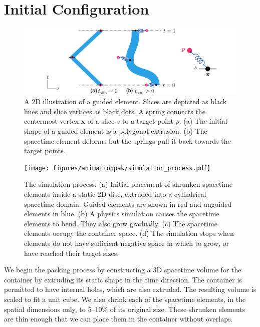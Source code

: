 \section{Initial Configuration}
\label{animationpak_initial_configuration}

\begin{figure}[t]
\centering
\includegraphics[width=1.0\textwidth]{figures/animationpak/guided_element.pdf} 
\caption[A 2D illustration of a guided element]{
\label{fig_animationpak_guided_element} A 2D illustration of a guided element.
Slices are depicted as black lines and slice vertices as black dots.
A spring connects the centermost vertex $\bm{x}$ of a slice $s$ to a target
point $p$.
(a) The initial shape of a guided element is a polygonal extrusion.
(b) The spacetime element deforms but the springs pull it back towards
the target points.}
\end{figure}

\begin{figure}[t]
\centering
\texttt{[image: figures/animationpak/simulation\_process.pdf]} 
\caption[AnimationPak simulation process]{
\label{fig_animationpak_simulation_process} The simulation process. 
(a) Initial placement of 
shrunken spacetime elements inside a static 2D disc, extruded into a 
cylindrical spacetime domain.
Guided elements are shown in red and unguided elements in blue.
(b) A physics simulation causes the spacetime elements to bend. They
also grow gradually.
(c) The spacetime elements occupy the container space.
(d) The simulation stops when elements do not have sufficient negative
space in which to grow, or have reached their target sizes.
}
\end{figure}

We begin the packing process by constructing a 3D spacetime volume for
the container by extruding its static shape in
the time direction.  The container is 
permitted to have internal holes, which are also extruded.  
The resulting volume is scaled to fit a unit cube.
We also shrink each of the spacetime elements, in the spatial dimensions
only, to 5--10\% of its original size.  These shrunken elements are 
thin enough that we can place them in the container without overlaps.


